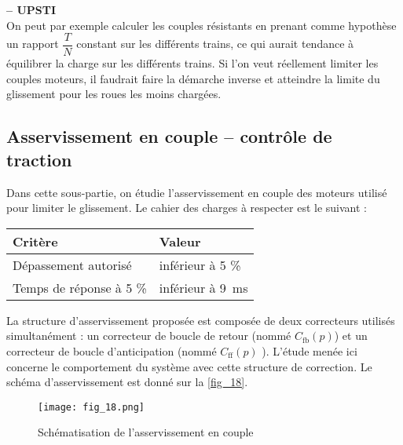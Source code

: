 \ifprof
\begin{corrige}\textbf{ -- UPSTI}\\ 
On peut par exemple calculer les couples résistants en prenant comme hypothèse un rapport $\dfrac{T}{N}$ constant sur les différents trains, ce qui aurait tendance à équilibrer la charge sur les différents trains.
Si l’on veut réellement limiter les couples moteurs, il faudrait faire la démarche inverse et atteindre la limite du glissement pour les roues les moins chargées.

\end{corrige}
\else
\fi


\subsection{Asservissement en couple – contrôle de traction}

\begin{obj}
Dans cette sous-partie, on étudie l’asservissement en couple des moteurs utilisé pour
limiter le glissement. Le cahier des charges à respecter est le suivant :

\begin{center}
\begin{tabular}{ll}
\hline
\textbf{Critère} & \textbf{Valeur} \\ \hline 
Dépassement autorisé & inférieur à 5 \% \\ 
Temps de réponse à 5 \% & inférieur à \SI{9}{ms} \\ \hline
\end{tabular}
\end{center}

\end{obj}
\ifprof
\else

La structure d’asservissement proposée est composée de deux correcteurs utilisés simultanément :
un correcteur de boucle de retour (nommé $C_{\text{fb}}( p)$) et un correcteur de boucle d'anticipation
(nommé $C_{\text{ff}}( p)$ ). L’étude menée ici concerne le comportement du système avec cette structure
de correction.
Le schéma d'asservissement est donné sur la \autoref{fig_18}.

\begin{figure}[H]
\centering
\texttt{[image: fig\_18.png]}
\caption{Schématisation de l'asservissement en couple \label{fig_18}}
\end{figure}


